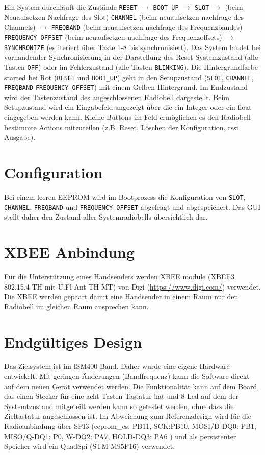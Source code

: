 Ein System durchläuft die Zustände \verb|RESET| $\rightarrow$ \verb|BOOT_UP| $\rightarrow$ \verb|SLOT| $\rightarrow$ (beim Neuaufsetzen Nachfrage des Slot) \verb|CHANNEL| (beim neuaufsetzen nachfrage des Channels) $\rightarrow$ \verb|FREQBAND| (beim neuaufsetzen nachfrage des Frequenzbandes) \verb|FREQUENCY_OFFSET| (beim neuaufsetzen nachfrage des Frequenzoffsets) $\rightarrow$  \verb|SYNCHRONIZE| (es iteriert über Taste 1-8 bis synchronisiert). Das System landet bei vorhandender Synchronisierung in der Darstellung des Reset Systemzustand (alle Tasten \verb|OFF|) oder im Fehlerzustand (alle Tasten \verb|BLINKING|). Die Hintergrundfarbe started bei Rot (\verb|RESET| und \verb|BOOT_UP|) geht in den Setupzustand (\verb|SLOT|, \verb|CHANNEL|,  \verb|FREQBAND| \verb|FREQUENCY_OFFSET|) mit einem Gelben Hintergrund. Im Endzustand wird der Tastenzustand des angeschlossenen Radiobell dargestellt. Beim Setupzustand wird ein Eingabefeld angezeigt über die ein Integer oder ein float eingegeben werden kann. Kleine Buttons im Feld ermöglichen es den Radiobell bestimmte Actions mitzuteilen (z.B. Reset, Löschen der Konfiguration, rssi Ausgabe).  

\section{Configuration}
Bei einem leeren EEPROM wird im Bootprozess die Konfiguration von  \verb|SLOT|, \verb|CHANNEL|, \verb|FREQBAND| und \verb|FREQUENCY_OFFSET| abgefragt und abgespeichert. Das GUI stellt daher den Zustand aller Systemradiobells übersichtlich dar.

\section{XBEE Anbindung}
Für die Unterstützung eines Handsenders werden XBEE module (XBEE3 802.15.4 TH mit U.Fl Ant TH MT) von Digi (\url{https://www.digi.com/}) verwendet. Die XBEE werden gepaart damit eine Handsender in einem Raum nur den Radiobell im gleichen Raum ansprechen kann.

\section{Endgültiges Design}
Das Zielsystem ist im ISM400 Band. Daher wurde eine eigene Hardware entwickelt. Mit geringen \"Anderungen (Bandfrequenz) kann die Software direkt auf dem neuen Ger\"at verwendet werden. Die Funktionalit\"at kann auf dem Board, das einen Stecker f\"ur eine acht Tasten Tastatur hat und 8 Led auf dem der Systemtzustand mitgeteilt werden kann so getestet werden, ohne dass die Zieltastatur angeschlossen ist. 
Im Abweichung zum Referenzdesign wird für die Radioanbindung über SPI3 (eeprom\_cs: PB11, SCK:PB10, MOSI/D-DQ0: PB1, MISO/Q-DQ1: P0, W-DQ2: PA7, HOLD-DQ3: PA6 ) und als persistenter Speicher wird ein QuadSpi (STM M95P16) verwendet.

